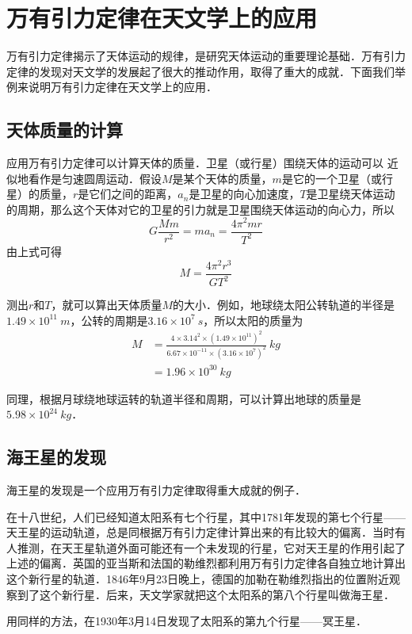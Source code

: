 \newpage
\section{万有引力定律在天文学上的应用}
万有引力定律揭示了天体运动的规律，是研究天体运动的重要理论基础．万有引力定律的发现对天文学的发展起了很大的推动作用，取得了重大的成就．下面我们举例来说明万有引力定律在天文学上的应用．

\subsection{天体质量的计算}

应用万有引力定律可以计算天体的质量．卫星（或行星）围绕天体的运动可以
近似地看作是匀速圆周运动．假设$M$是某个天体的质量，$m$是它的一个卫星（或行星）的质量，$r$是它们之间的距离，$a_n$是卫星的向心加速度，$T$是卫星绕天体运动的周期，那么这个天体对它的卫星的引力就是卫星围绕天体运动的向心力，所以
\[G\frac{Mm}{r^2}=ma_n=\frac{4\pi^2 mr}{T^2} \]
由上式可得
\[M=\frac{4\pi^2r^3}{GT^2} \]

测出$r$和$T$，就可以算出天体质量$M$的大小．例如，地球绕太阳公转轨道的半径是$1.49\times 10^{11}~\si{m}$，公转的周期是$3.16\times 10^7~\si{s}$，所以太阳的质量为
\[\begin{split}
		M & = \frac{4\times 3.14^2\times (1.49\times 10^{11})^2}{6.67\times 10^{-11}\times (3.16\times 10^7)^2}~\si{kg} \\
		  & =1.96\times 10^{30}~\si{kg}
	\end{split} \]


同理，根据月球绕地球运转的轨道半径和周期，可以计算出地球的质量是$5. 98\times 10^{24}~\si{kg}$．

\subsection{海王星的发现}

海王星的发现是一个应用万有引力定律取得重大成就的例子．

在十八世纪，人们已经知道太阳系有七个行星，其中1781年发现的第七个行星——天王星的运动轨道，总是同根据万有引力定律计算出来的有比较大的偏离．当时有人推测，在天王星轨道外面可能还有一个未发现的行星，它对天王星的作用引起了上述的偏离．英国的亚当斯和法国的勒维烈都利用万有引力定律各自独立地计算出这个新行星的轨道．1846年9月23日晚上，德国的加勒在勒维烈指出的位置附近观察到了这个新行星．后来，天文学家就把这个太阳系的第八个行星叫做海王星．

用同样的方法，在1930年3月14日发现了太阳系的第九个行星——冥王星．

